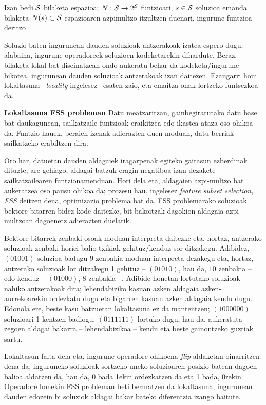 \documentclass[eu]{ifirak}\usepackage[]{graphicx}\usepackage[]{color}
\begin{document}
\begin{ifdefinition}
Izan bedi $\cal S$ bilaketa espazioa; $N:{\cal S} \rightarrow 2^{\cal S}$ funtzioari, $s\in {\cal S}$ soluzioa emanda bilaketa $N(s)\subset {\cal S}$ espazioaren azpimultzo itzultzen duenari, ingurune funtzioa deritzo
\end{ifdefinition}

Soluzio baten ingurunean dauden soluzioak antzerakoak izatea espero dugu; alabaina, ingurune operadoreek soluzioen kodeketarekin dihardute. Beraz, bilaketa lokal bat diseinatzean ondo aukeratu behar da kodeketa/ingurune bikotea, ingurunean dauden soluzioak antzerakoak izan daitezen. Ezaugarri honi lokaltasuna --\textit{locality} ingelesez-- esaten zaio, eta emaitza onak lortzeko funtsezkoa da.

\begin{tcolorbox}
\begin{ifexample}{\bf Lokaltasuna FSS probleman}
Datu meatzaritzan, gainbegiratutako datu base bat daukagunean, sailkatzaile funtzioak eraikitzea edo ikastea ataza oso ohikoa da. Funtzio hauek, beraien izenak adierazten duen moduan, datu berriak sailkatzeko erabiltzen dira. 

Oro har, datuetan dauden aldagaiek iragarpenak egiteko gaitasun ezberdinak dituzte; are gehiago, aldagai batzuk eragin negatiboa izan dezakete sailkatzailearen funtzionamenduan. Hori dela eta, aldagaien azpi-multzo bat aukeratzea oso pausu ohikoa da; prozesu hau, ingelesez {\em feature subset selection, FSS} deitzen dena, optimizazio problema bat da. FSS problemarako soluzioak bektore bitarren bidez kode daitezke, bit bakoitzak dagokion aldagaia azpi-multzoan dagoenetz adierazten duelarik. 

Bektore bitarrek zenbaki osoak moduan interpreta daitezke eta, hortaz, antzerako soluzioak zenbaki horiei balio txikiak gehituz/kenduz sor ditzakegu. Adibidez, $(01001)$ soluzioa badugu $9$ zenbakia moduan interpreta dezakegu eta, hortaz, antzerako soluzioak lor ditzakegu 1 gehituz -- $(01010)$, hau da, $10$ zenbakia -- edo kenduz -- $(01000)$, $8$ zenbakia --. Adibide honetan lortutako soluzioak nahiko antzerakoak dira; lehendabiziko kasuan azken aldagaia azken-aurrekoarekin ordezkatu dugu eta bigarren kasuan azken aldagaia kendu dugu. Edonola ere, beste kasu batzuetan lokaltasuna ez da mantentzen; $(1000000)$ soluzioari 1 kentzen badiogu, $(0111111)$ lortuko dugu, hau da, aukeratuta zegoen aldagai bakarra -- lehendabizikoa -- kendu eta beste gainontzeko guztiak sartu.

Lokaltasun falta dela eta, ingurune operadore ohikoena {\em flip} aldaketan oinarritzen dena da; inguruneko soluzioak sortzeko uneko soluzioaren posizio batean dagoen balioa aldatzen da, hau da, 0 bada 1ekin ordezkatzen da eta 1 bada, 0rekin. Operadore honekin FSS probleman beti bermatzen da lokaltasuna, ingurunean dauden edozein bi soluziok aldagai bakar bateko diferentzia izango baitute.
\end{ifexample}
\end{tcolorbox}
\end{document}
